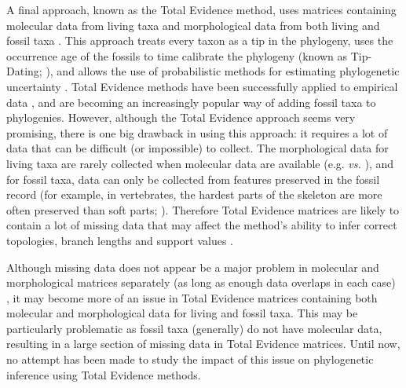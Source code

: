 \documentclass[12pt,letterpaper]{article}
\begin{document}
A final approach, known as the Total Evidence method, uses matrices containing molecular data from living taxa and morphological data from both living and fossil taxa \citep{eernissetaxonomic1993}. This approach treats every taxon as a tip in the phylogeny, uses the occurrence age of the fossils to time calibrate the phylogeny (known as Tip-Dating; \citealt{ronquista2012}), and allows the use of probabilistic methods for estimating phylogenetic uncertainty \citep{ronquista2012}. Total Evidence methods have been successfully applied to empirical data \citep[e.g.][]{pyrondivergence2011,ronquista2012,schragocombining2013,slaterphylogenetic2013,beckancient2014}, and are becoming an increasingly popular way of adding fossil taxa to phylogenies. However, although the Total Evidence approach seems very promising, there is one big drawback in using this approach: it requires a lot of data that can be difficult (or impossible) to collect. The morphological data for living taxa are rarely collected when molecular data are available (e.g. \citealt{O'Leary08022013} \textit{vs.} \citealt{meredithimpacts2011}), and for fossil taxa, data can only be collected from features preserved in the fossil record (for example, in vertebrates, the hardest parts of the skeleton are more often preserved than soft parts; \citealt{sansomfossilization2013}). Therefore Total Evidence matrices are likely to contain a lot of missing data that may affect the method's ability to infer correct topologies, branch lengths and support values \citep{salamin2003}. 

Although missing data does not appear be a major problem in molecular and morphological matrices separately (as long as enough data overlaps in each case) \citep{wiensmissing2003,wiensmissing2006,wiensmissing2008,rouresite-specific2011,pattinsonphylogeny2014}, it may become more of an issue in Total Evidence matrices containing both molecular and morphological data for living and fossil taxa. This may be particularly problematic as fossil taxa (generally) do not have molecular data, resulting in a large section of missing data in Total Evidence matrices. Until now, no attempt has been made to study the impact of this issue on phylogenetic inference using Total Evidence methods.
\end{document}

